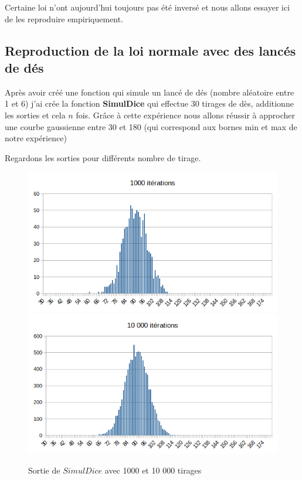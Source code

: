 \documentclass[12pt,french]{article} %
\begin{document}
Certaine loi n'ont aujourd'hui toujours pas été inversé et nous allons essayer ici de les reproduire empiriquement.

\subsection{Reproduction de la loi normale avec des lancés de dés}

Après avoir créé une fonction qui simule un lancé de dés (nombre aléatoire entre 1 et 6) j'ai crée la fonction \textbf{SimulDice} qui effectue 30 tirages de dès, additionne les sorties et cela $n$ fois. Grâce à cette expérience nous allons réussir à approcher une courbe gaussienne entre 30 et 180 (qui correspond aux bornes min et max de notre expérience)

Regardons les sorties pour différents nombre de tirage.

\begin{figure}[H]
	\centering
	\includegraphics[scale=0.35]{exo5-1.png}
	\includegraphics[scale=0.35]{exo5-2.png}
	\caption{Sortie de $SimulDice$ avec 1000 et 10 000 tirages}    
\end{figure}
\end{document}
